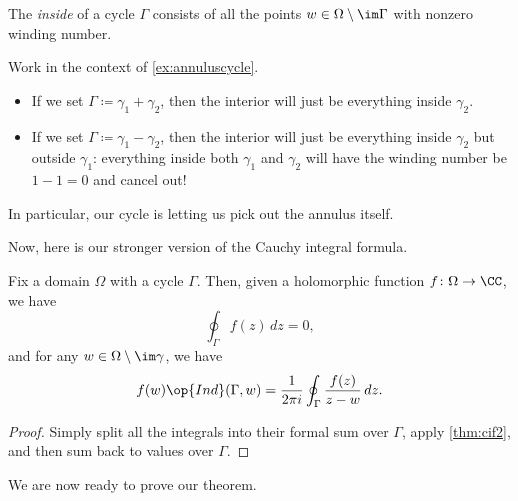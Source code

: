 \begin{definition}[Inside]
	The \textit{inside} of a cycle $\Gamma$ consists of all the points $w\in\Omega\setminus\im\Gamma$ with nonzero winding number.
\end{definition}
\begin{example} \label{ex:insideannulus}
	Work in the context of \autoref{ex:annuluscycle}.
	\begin{itemize}
		\item If we set $\Gamma\coloneqq\gamma_1+\gamma_2$, then the interior will just be everything inside $\gamma_2$.
		\item If we set $\Gamma\coloneqq\gamma_1-\gamma_2$, then the interior will just be everything inside $\gamma_2$ but outside $\gamma_1$: everything inside both $\gamma_1$ and $\gamma_2$ will have the winding number be $1-1=0$ and cancel out!
	\end{itemize}
	In particular, our cycle is letting us pick out the annulus itself.
\end{example}
Now, here is our stronger version of the Cauchy integral formula.
\begin{theorem} \label{thm:cif3}
	Fix a domain $\Omega$ with a cycle $\Gamma$. Then, given a holomorphic function $f\colon\Omega\to\CC$, we have
	\[\oint_\Gamma f(z)\,dz=0,\]
	and for any $w\in\Omega\setminus\im\gamma$, we have
	\[f(w)\op{Ind}(\Gamma,w)=\frac1{2\pi i}\oint_\Gamma\frac{f(z)}{z-w}\,dz.\]
\end{theorem}
\begin{proof}
	Simply split all the integrals into their formal sum over $\Gamma$, apply \autoref{thm:cif2}, and then sum back to values over $\Gamma$.
\end{proof}
We are now ready to prove our theorem.
